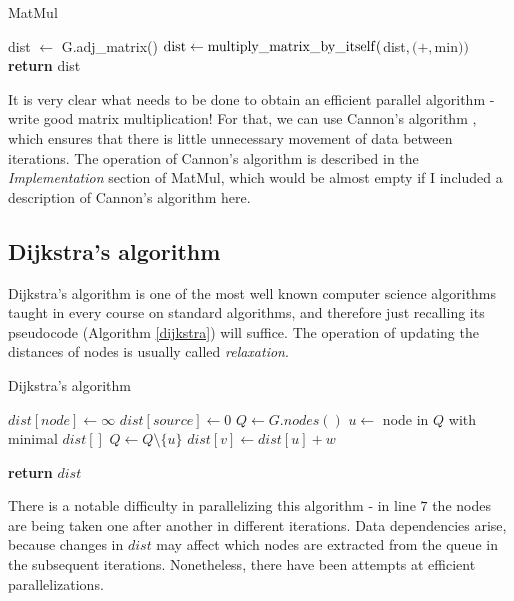 \documentclass[12pt,a4paper,oneside,openright]{report}
\begin{document}
\begin{algorithm}
\caption{MatMul}\label{matmul}
\begin{algorithmic}[1]
\State dist $\gets$ G.adj\_matrix()
        \State $\rm{dist} \gets {\rm multiply\_matrix\_by\_itself}($dist$,(+,$min$))$
      \EndFor
\State \textbf{return} dist
\EndProcedure
\end{algorithmic}
\end{algorithm}

It is very clear what needs to be done to obtain an efficient parallel algorithm - write good matrix multiplication! For that, we can use Cannon's algorithm \cite{cannon}, which ensures that there is little unnecessary movement of data between iterations. The operation of Cannon's algorithm is described in the \textit{Implementation} section of MatMul, which would be almost empty if I included a description of Cannon's algorithm here. 

\subsection{Dijkstra's algorithm}
Dijkstra's algorithm is one of the most well known computer science algorithms taught in every course on standard algorithms, and therefore just recalling its pseudocode (Algorithm \ref{dijkstra}) will suffice. The operation of updating the distances of nodes is usually called \textit{relaxation}.

\begin{algorithm}
\caption{Dijkstra's algorithm}\label{dijkstra}
\begin{algorithmic}[1]
    \State $dist[node] \gets \infty$
\EndFor
\State $dist[source] \gets 0$
\State $Q \gets G.nodes()$
        \State $u \gets$ node in $Q$ with minimal $dist[]$
        \State $Q \gets Q \setminus \{u\}$
            \State $dist[v] \gets dist[u] + w$
        \EndIf
      \EndFor
    \EndWhile
    
    
\State \textbf{return} $dist$
\EndProcedure
\end{algorithmic}
\end{algorithm}

There is a notable difficulty in parallelizing this algorithm - in line $7$ the nodes are being taken one after another in different iterations. Data dependencies arise, because changes in $dist$ may affect which nodes are extracted from the queue in the subsequent iterations. Nonetheless, there have been attempts at efficient parallelizations.
\end{document}

